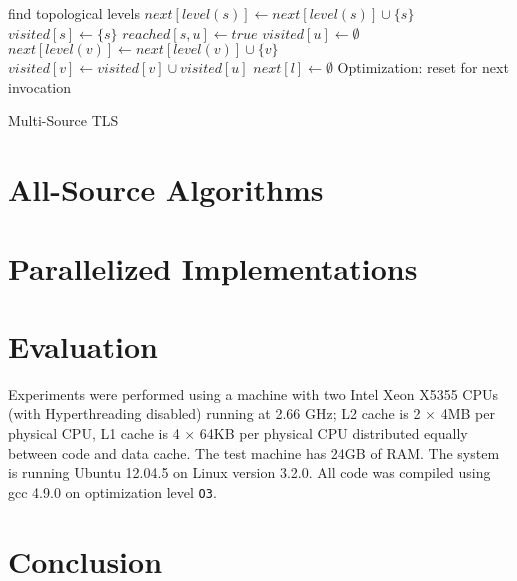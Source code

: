\documentclass[12pt,a4paper,twoside]{article}
\DeclareMathOperator*{\argmin}{\arg\!\min}
\begin{document}
\begin{algorithm}
  \begin{algorithmic}
      \State find topological levels
        \State $next[level(s)] \gets next[level(s)] \cup \{s\}$
        \State $visited[s] \gets \{s\}$
      \EndFor
      \For{$l \gets \argmin_{s \in S} level(s), maxLevel$}
            \State $reached[s, u] \gets true$
          \EndFor
          \State $visited[u] \gets \emptyset$
              \State $next[level(v)] \gets next[level(v)] \cup \{v\}$
            \EndIf
            \State $visited[v] \gets visited[v] \cup visited[u]$
          \EndFor
        \EndFor
        \State $next[l] \gets \emptyset$ \Comment Optimization: reset for next invocation
      \EndFor
    \EndFunction
  \end{algorithmic}
  \caption{Multi-Source TLS}
  \label{algo:MultiTLS}
\end{algorithm}

\section{All-Source Algorithms}

\section{Parallelized Implementations}

\section{Evaluation}

Experiments were performed using a machine with two Intel Xeon X5355 CPUs (with Hyperthreading disabled) running at 2.66 GHz; L2 cache is 2 $\times$ 4MB per physical CPU, L1 cache is 4 $\times$ 64KB per physical CPU distributed equally between code and data cache. The test machine has 24GB of RAM.
The system is running Ubuntu 12.04.5 on Linux version 3.2.0. All code was compiled using gcc 4.9.0 on optimization level \texttt{O3}.



\section{Conclusion}
\end{document}
